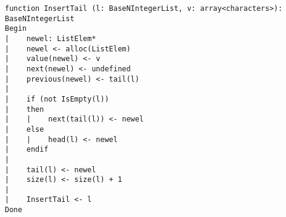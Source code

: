 \begin{lstlisting}[breaklines]
function InsertTail (l: BaseNIntegerList, v: array<characters>): BaseNIntegerList
Begin
|    newel: ListElem*
|    newel <- alloc(ListElem)
|    value(newel) <- v
|    next(newel) <- undefined
|    previous(newel) <- tail(l)
|
|    if (not IsEmpty(l))
|    then
|    |    next(tail(l)) <- newel
|    else
|    |    head(l) <- newel
|    endif
|
|    tail(l) <- newel
|    size(l) <- size(l) + 1
|
|    InsertTail <- l
Done
\end{lstlisting}
